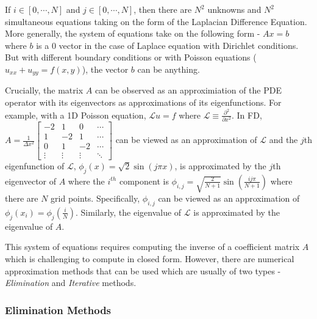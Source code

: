 \documentclass[12pt]{article}
\begin{document}
If $i \in [0, \cdots, N]$ and $j \in [0, \cdots, N]$, then there are $N^2$ unknowns and $N^2$ simultaneous equations taking on the form of the Laplacian Difference Equation. More generally, the system of equations take on the following form - $Ax = b$ where $b$ is a 0 vector in the case of Laplace equation with Dirichlet conditions. But with different boundary conditions or with Poisson equations ($u_{xx} + u_{yy} = f(x, y)$), the vector $b$ can be anything.

Crucially, the matrix $A$ can be observed as an approximiation of the PDE operator with its eigenvectors as approximations of its eigenfunctions. For example, with a 1D Poisson equation, $\mathcal{L} u = f$ where $\mathcal{L} \equiv \frac{\partial^2}{\partial x^2}$. In FD, $A = \frac{1}{\Delta x^2} \begin{bmatrix}
    -2 &1 &0 & \cdots \\
    1 & -2 & 1 & \cdots \\
    0 & 1 & -2 & \cdots \\
    \vdots & \vdots & \vdots & \ddots 
\end{bmatrix}$ can be viewed as an approximation of $\mathcal{L}$ and the $j$th eigenfunction of $\mathcal{L}$, $\phi_j(x) = \sqrt{2}\sin(j \pi x)$, is approximated by the $j$th eigenvector of $A$ where the $i^{th}$ component is $\phi_{i, j} = \sqrt{\frac{2}{N + 1}}\sin \left(\frac{ij\pi}{N + 1}\right)$ where there are $N$ grid points. Specifically, $\phi_{i, j}$ can be viewed as an approximation of $\phi_j(x_i) = \phi_j(\frac{i}{N})$. Similarly, the eigenvalue of $\mathcal{L}$ is approximated by the eigenvalue of $A$.

This system of equations requires computing the inverse of a coefficient matrix $A$ which is challenging to compute in closed form. However, there are numerical approximation methods that can be used which are usually of two types - \textit{Elimination} and \textit{Iterative} methods. 

\subsubsection{Elimination Methods}
\end{document}
